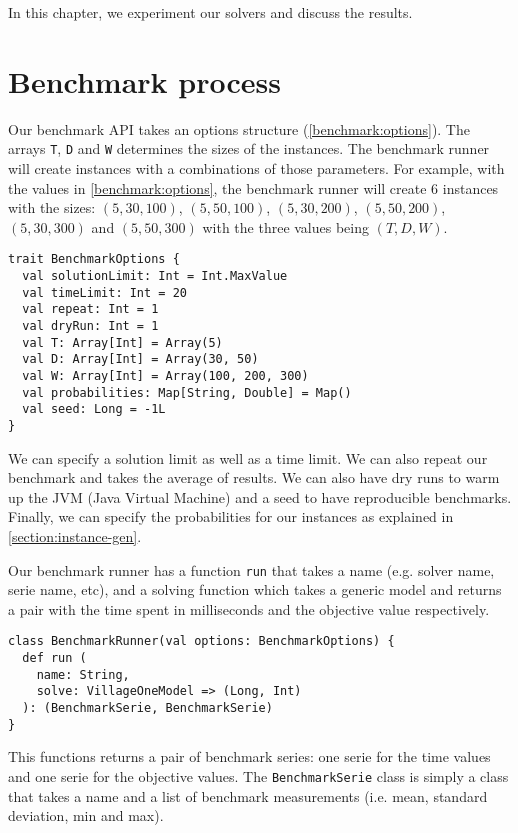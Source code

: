 \documentclass[../../thesis.tex]{subfiles}
\begin{document}
In this chapter, we experiment our solvers and discuss the results. 

\section{Benchmark process}

Our benchmark API takes an options structure (\autoref{benchmark:options}).
The arrays \texttt{T}, \texttt{D} and \texttt{W} determines the sizes of the instances. The benchmark runner 
will create instances with a combinations of those parameters. For example, with the values in \autoref{benchmark:options},
the benchmark runner will create 6 instances with the sizes: $(5, 30, 100)$, $(5, 50, 100)$, $(5, 30, 200)$, $(5, 50, 200)$, $(5, 30, 300)$ and $(5, 50, 300)$ with the 
three values being $(T, D, W)$.

\begin{lstlisting}[style=scalaStyle,label={benchmark:options},caption={Benchmark options},captionpos=b]
trait BenchmarkOptions {
  val solutionLimit: Int = Int.MaxValue
  val timeLimit: Int = 20
  val repeat: Int = 1
  val dryRun: Int = 1
  val T: Array[Int] = Array(5)
  val D: Array[Int] = Array(30, 50)
  val W: Array[Int] = Array(100, 200, 300)
  val probabilities: Map[String, Double] = Map()
  val seed: Long = -1L
}
\end{lstlisting}

We can specify a solution limit as well as a time limit. We can also repeat our benchmark and takes 
the average of results. We can also have dry runs to warm up the JVM (Java Virtual Machine) and a seed to have reproducible benchmarks. Finally,
we can specify the probabilities for our instances as explained in \autoref{section:instance-gen}.

Our benchmark runner has a function \texttt{run} that takes a name (e.g. solver name, serie name, etc), and a solving function 
which takes a generic model and returns a pair with the time spent in milliseconds and the objective value respectively.

\begin{lstlisting}[style=scalaStyle,label={benchmark:run},caption={Benchmark run function},captionpos=b]
class BenchmarkRunner(val options: BenchmarkOptions) {
  def run (
    name: String, 
    solve: VillageOneModel => (Long, Int)
  ): (BenchmarkSerie, BenchmarkSerie)
}
\end{lstlisting}

This functions returns a pair of benchmark series: one serie for the time values and one serie for the objective values.
The \texttt{BenchmarkSerie} class is simply a class that takes a name and a list of benchmark measurements (i.e. mean, standard deviation, min and max).
\end{document}
